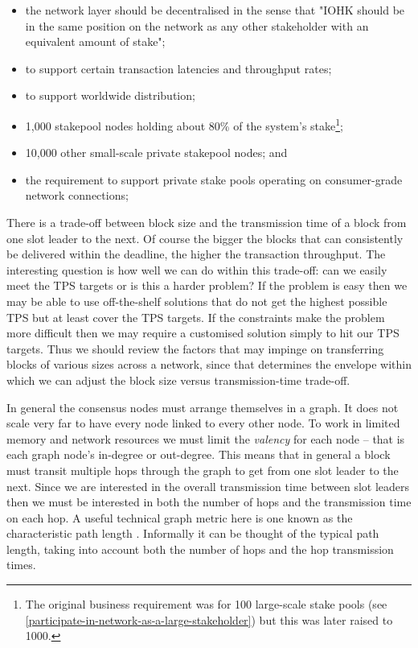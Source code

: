 \documentclass[11pt,a4paper]{article}
\begin{document}
\begin{itemize}
\item
  the network layer should be decentralised in the sense that "IOHK
  should be in the same position on the network as any other stakeholder
  with an equivalent amount of stake";
\item
  to support certain transaction latencies and throughput rates;
\item
  to support worldwide distribution;
\item
  1,000 stakepool nodes holding about 80\% of the system's
  stake\footnote{The original business requirement was for 100
    large-scale stake pools (see
    \cref{participate-in-network-as-a-large-stakeholder}) but this was
    later raised to 1000.};
\item
  10,000 other small-scale private stakepool nodes; and
\item
  the requirement to support private stake pools operating on
  consumer-grade network connections;
\end{itemize}

There is a trade-off between block size and the transmission time of a
block from one slot leader to the next. Of course the bigger the blocks
that can consistently be delivered within the deadline, the higher the
transaction throughput. The interesting question is how well we can do
within this trade-off: can we easily meet the TPS targets or is this a
harder problem? If the problem is easy then we may be able to use
off-the-shelf solutions that do not get the highest possible TPS but at
least cover the TPS targets. If the constraints make the problem more
difficult then we may require a customised solution simply to hit our
TPS targets. Thus we should review the factors that may impinge on
transferring blocks of various sizes across a network, since that
determines the envelope within which we can adjust the block size versus
transmission-time trade-off.

In general the consensus nodes must arrange themselves in a graph. It
does not scale very far to have every node linked to every other node.
To work in limited memory and network resources we must limit the
\emph{valency} for each node -- that is each graph node's in-degree or
out-degree. This means that in general a block must transit multiple
hops through the graph to get from one slot leader to the next. Since we
are interested in the overall transmission time between slot leaders
then we must be interested in both the number of hops and the
transmission time on each hop. A useful technical graph metric here is
one known as the characteristic path length \cite{Watts99}. 
Informally it can be thought of the
typical path length, taking into account both the number of hops and
the hop transmission times.
\end{document}
